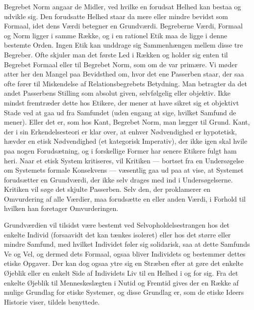 \documentclass[12pt]{article}
\newcommand{\opage}[1]{\marginnote{\footnotesize\textit{[#1]}}}
\begin{document}
Begrebet Norm angaar de Midler, ved hvilke en forudsat Helhed kan bestaa
og udvikle sig. Den forudsatte Helhed staar da mere eller mindre bevidst
som Formaal, idet dens Værdi betegner en Grundværdi. Begreberne Værdi,
Formaal og Norm ligger i samme Række, og i en rationel Etik maa de ligge
i denne bestemte Orden. Ingen Etik kan unddrage sig Sammenhængen mellem
disse tre Begreber. Ofte skjuler man det første Led i Rækken og holder
sig enten til Begrebet Formaal eller til Begrebet Norm, som om de var
primære. Vi møder atter her den Mangel paa Bevidsthed om, hvor det ene
Passerben staar, der saa ofte fører til Miskendelse af
Relationsbegrebets Betydning. Man betragter da det andet Passerbens
Stilling som absolut given, selvfølgelig eller \guillemotright
objektiv\guillemotleft. Ikke mindst fremtræder
\opage{84} dette hos Etikere, der mener at have sikret sig et \guillemotright
objektivt\guillemotleft{} Stade ved at gaa ud fra \guillemotright
Samfundet\guillemotleft{} (uden engang at sige, hvilket Samfund de
mener). Eller det er, som hos Kant, Begrebet Norm, man lægger til Grund.
Kant, der i sin Erkendelsesteori er klar over, at enhver Nødvendighed er
hypotetisk, hævder en etisk Nødvendighed (et kategorisk Imperativ), der
ikke igen skal hvile paa nogen Forudsætning, og i forskellige Former har
senere Etikere fulgt ham heri. Naar et etisk System kritiseres, vil
Kritiken --- bortset fra en Undersøgelse om Systemets formale Konsekvens
--- væsentlig gaa ud paa at vise, at Systemet forudsætter en Grundværdi,
der ikke selv drages med ind i Undersøgelserne. Kritiken vil søge det
skjulte Passerben. Selv den, der proklamerer en \guillemotright
Omvurdering af alle Værdier\guillemotleft, maa forudsætte en eller
anden Værdi, i Forhold til hvilken han foretager Omvurderingen.

Grundværdien vil tilsidst være bestemt ved Selvopholdelsestrangen hos
det enkelte Individ (forsaavidt det kan tænkes isoleret) eller hos det
større eller mindre Samfund, med hvilket Individet føler sig solidarisk,
saa at dette Samfunds Ve og Vel, og dermed dets Formaal, ogsaa bliver
Individets og bestemmer dettes etiske Opgaver. Der kan dog ogsaa ytre
sig en Stræben efter at gøre det enkelte Øjeblik eller en enkelt Side af
Individets Liv til en Helhed i og for sig. Fra det enkelte Øjeblik til
Menneskeslægten i Nutid og Fremtid gives der en Række af mulige Grundlag
for etiske Systemer, og disse Grundlag er, som de etiske Ideers Historie
viser, tildels benyttede.
\end{document}
